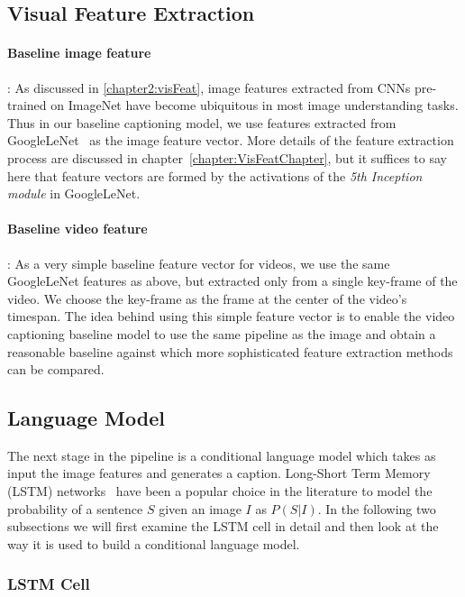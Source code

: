 \subsection{Visual Feature Extraction}

\paragraph{Baseline image feature}: As discussed in \ref{chapter2:visFeat},
image features extracted from CNNs pre-trained on ImageNet have become
ubiquitous in most image understanding tasks.
Thus in our baseline captioning model, we use features extracted from
GoogleLeNet~\cite{DBLP:journals/corr/SzegedyLJSRAEVR14} as the image feature
vector. 
More details of the feature extraction process are discussed in
chapter~\ref{chapter:VisFeatChapter}, but it suffices to say here that feature
vectors are formed by the activations of the \emph{5th Inception module} in
GoogleLeNet.

\paragraph{Baseline video feature}: As a very simple baseline feature vector for
videos, we use the same GoogleLeNet features as above, but extracted only from a
single key-frame of the video.
We choose the key-frame as the frame at the center of the video's timespan.
The idea behind using this simple feature vector is to enable the video
captioning baseline model to use the same pipeline as the image and obtain a
reasonable baseline against which more sophisticated feature extraction methods
can be compared. 

\subsection{Language Model}

The next stage in the pipeline is a conditional language model which
takes as input the image features and generates a caption. 
Long-Short Term Memory (LSTM) networks~\cite{Hochreiter1997} have been a popular
choice in the literature to model the probability of a sentence $S$ given an
image $I$ as $P(S|I)$.
In the following two subsections we will first examine the LSTM cell in detail and
then look at the way it is used to build a conditional language model.

\subsubsection{LSTM Cell}

